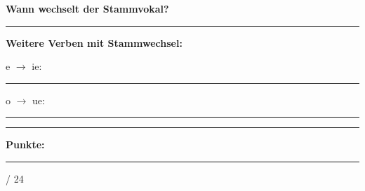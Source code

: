 \documentclass[11pt, a4paper]{article}
\newcommand{\maxpunkte}{24}
\newcommand{\luecke}[1]{\rule{#1}{0.4pt}}
\begin{document}

\begin{merkkasten}
\textbf{Wann wechselt der Stammvokal?}

\vspace{0.5em}
\luecke{12cm}

\vspace{0.5em}
\textbf{Weitere Verben mit Stammwechsel:}

e $\rightarrow$ ie: \luecke{6cm}

o $\rightarrow$ ue: \luecke{6cm}
\end{merkkasten}

\vspace{20pt}
\hrule
\vspace{10pt}

\begin{flushright}
\textbf{Punkte:} \luecke{1cm} / \maxpunkte
\end{flushright}
\end{document}
